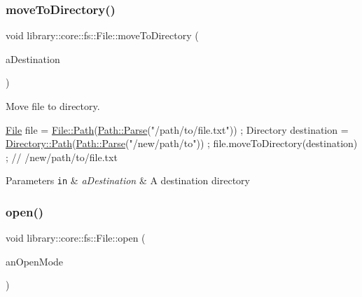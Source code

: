 \subsubsection{\texorpdfstring{move\+To\+Directory()}{moveToDirectory()}}
{\footnotesize\ttfamily void library\+::core\+::fs\+::\+File\+::move\+To\+Directory (\begin{DoxyParamCaption}\item[{const \hyperlink{classlibrary_1_1core_1_1fs_1_1_directory}{fs\+::\+Directory} \&}]{a\+Destination }\end{DoxyParamCaption})}



Move file to directory. 


\begin{DoxyCode}
\hyperlink{classlibrary_1_1core_1_1fs_1_1_file_a6f3f0d79545ac9984c6f49432f0c6c39}{File} file = \hyperlink{classlibrary_1_1core_1_1fs_1_1_file_a72d6cdf8bb7e299889c6149e2b8a6cc7}{File::Path}(\hyperlink{classlibrary_1_1core_1_1fs_1_1_path_a6ba644b6609507e724c217bf2020f5ae}{Path::Parse}(\textcolor{stringliteral}{"/path/to/file.txt"})) ;
Directory destination = \hyperlink{classlibrary_1_1core_1_1fs_1_1_directory_ae906e33e4659219cf296dd314c7726b8}{Directory::Path}(\hyperlink{classlibrary_1_1core_1_1fs_1_1_path_a6ba644b6609507e724c217bf2020f5ae}{Path::Parse}(\textcolor{stringliteral}{"/new/path/to"})) ;
file.moveToDirectory(destination) ; \textcolor{comment}{// /new/path/to/file.txt}
\end{DoxyCode}



\begin{DoxyParams}[1]{Parameters}
\mbox{\tt in}  & {\em a\+Destination} & A destination directory \\
\hline
\end{DoxyParams}
\mbox{\label{classlibrary_1_1core_1_1fs_1_1_file_ad02420dc1c5238f384ca1e5a75b13ee9}} 
\subsubsection{\texorpdfstring{open()}{open()}}
{\footnotesize\ttfamily void library\+::core\+::fs\+::\+File\+::open (\begin{DoxyParamCaption}\item[{const \hyperlink{classlibrary_1_1core_1_1fs_1_1_file_ac18b7d7ee50c803cbd0087b0f71ce4f7}{File\+::\+Open\+Mode} \&}]{an\+Open\+Mode }\end{DoxyParamCaption})}




